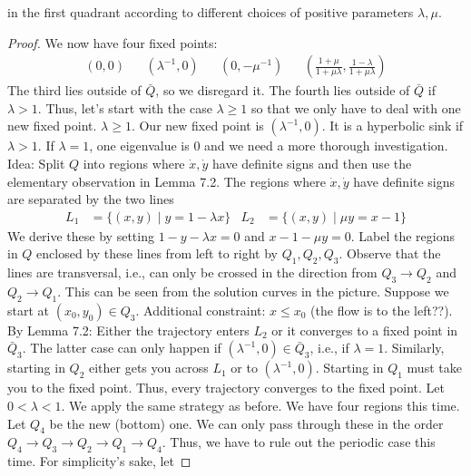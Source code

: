 \documentclass[../psets.tex]{subfiles}
\begin{document}
\begin{enumerate}
\begin{equation*}
    \end{equation*}
    in the first quadrant according to different choices of positive parameters $\lambda,\mu$.
    \begin{proof}
        We now have four fixed points:
        \begin{align*}
            (0,0)&&
            (\lambda^{-1},0)&&
            (0,-\mu^{-1})&&
            \left( \frac{1+\mu}{1+\mu\lambda},\frac{1-\lambda}{1+\mu\lambda} \right)
        \end{align*}
        The third lies outside of $\bar{Q}$, so we disregard it.
        The fourth lies outside of $\bar{Q}$ if $\lambda>1$. Thus, let's start with the case $\lambda\geq 1$ so that we only have to deal with one new fixed point.
        $\lambda\geq 1$.
        Our new fixed point is $(\lambda^{-1},0)$.
        It is a hyperbolic sink if $\lambda>1$.
        If $\lambda=1$, one eigenvalue is 0 and we need a more thorough investigation.
        Idea: Split $Q$ into regions where $\dot{x},\dot{y}$ have definite signs and then use the elementary observation in Lemma 7.2.
        The regions where $\dot{x},\dot{y}$ have definite signs are separated by the two lines
        \begin{align*}
            L_1 &= \{(x,y)\mid y=1-\lambda x\}&
            L_2 &= \{(x,y)\mid\mu y=x-1\}
        \end{align*}
        We derive these by setting $1-y-\lambda x=0$ and $x-1-\mu y=0$.
        Label the regions in $Q$ enclosed by these lines from left to right by $Q_1,Q_2,Q_3$.
        Observe that the lines are transversal, i.e., can only be crossed in the direction from $Q_3\to Q_2$ and $Q_2\to Q_1$. This can be seen from the solution curves in the picture.
        Suppose we start at $(x_0,y_0)\in Q_3$.
        Additional constraint: $x\leq x_0$ (the flow is to the left??).
        By Lemma 7.2: Either the trajectory enters $L_2$ or it converges to a fixed point in $\bar{Q}_3$. The latter case can only happen if $(\lambda^{-1},0)\in\bar{Q}_3$, i.e., if $\lambda=1$.
        Similarly, starting in $Q_2$ either gets you across $L_1$ or to $(\lambda^{-1},0)$.
        Starting in $Q_1$ must take you to the fixed point.
        Thus, every trajectory converges to the fixed point.
        Let $0<\lambda<1$.
        We apply the same strategy as before.
        We have four regions this time. Let $Q_4$ be the new (bottom) one. We can only pass through these in the order $Q_4\to Q_3\to Q_2\to Q_1\to Q_4$.
        Thus, we have to rule out the periodic case this time.
        For simplicity's sake, let

\end{proof}
\end{enumerate}
\end{document}
